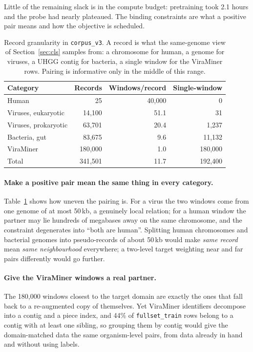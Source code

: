 \documentclass[10pt,twocolumn,a4paper]{article}
\begin{document}
Little of the remaining slack is in the compute budget: pretraining took 2.1
hours and the probe had nearly plateaued. The binding constraints are what a
positive pair means and how the objective is scheduled.

\begin{table}[t]
\centering
\caption{Record granularity in \texttt{corpus\_v3}. A record is what the
same-genome view of Section~\ref{sec:cls} samples from: a chromosome for human, a
genome for viruses, a UHGG contig for bacteria, a single window for the ViraMiner
rows. Pairing is informative only in the middle of this range.}
\label{tab:records}
\footnotesize
\setlength{\tabcolsep}{4pt}
\begin{tabular}{lrrr}
\toprule
Category & Records & Windows/record & Single-window \\
\midrule
Human                & 25      & 40{,}000 & 0 \\
Viruses, eukaryotic  & 14{,}100  & 51.1   & 31 \\
Viruses, prokaryotic & 63{,}701  & 20.4   & 1{,}237 \\
Bacteria, gut        & 83{,}675  & 9.6    & 11{,}132 \\
ViraMiner            & 180{,}000 & 1.0    & 180{,}000 \\
\midrule
Total                & 341{,}501 & 11.7   & 192{,}400 \\
\bottomrule
\end{tabular}
\end{table}

\paragraph{Make a positive pair mean the same thing in every category.}
Table~\ref{tab:records} shows how uneven the pairing is. For a virus the two
windows come from one genome of at most 50\,kb, a genuinely local relation; for a
human window the partner may lie hundreds of megabases away on the same
chromosome, and the constraint degenerates into ``both are human''. Splitting
human chromosomes and bacterial genomes into pseudo-records of about 50\,kb would
make \emph{same record} mean \emph{same neighbourhood} everywhere; a two-level
target weighting near and far pairs differently would go further.

\paragraph{Give the ViraMiner windows a real partner.}
The 180{,}000 windows closest to the target domain are exactly the ones that fall
back to a re-augmented copy of themselves. Yet ViraMiner identifiers decompose
into a contig and a piece index, and 44\% of \texttt{fullset\_train} rows belong
to a contig with at least one sibling, so grouping them by contig would give the
domain-matched data the same organism-level pairs, from data already in hand and
without using labels.
\end{document}
